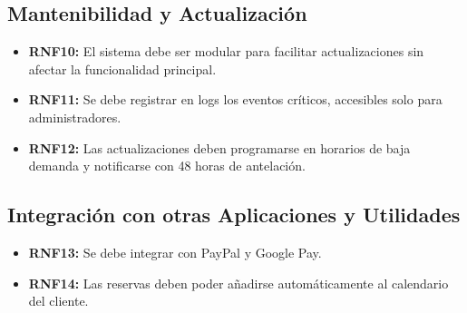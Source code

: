 \documentclass[a4paper, 12pt]{article}
\begin{document}
\subsection{Mantenibilidad y Actualización}
\begin{itemize}
    \item \textbf{RNF10:} El sistema debe ser modular para facilitar actualizaciones sin afectar la funcionalidad principal.
    \item \textbf{RNF11:} Se debe registrar en logs los eventos críticos, accesibles solo para administradores.
    \item \textbf{RNF12:} Las actualizaciones deben programarse en horarios de baja demanda y notificarse con 48 horas de antelación.
\end{itemize}

\subsection{Integración con otras Aplicaciones y Utilidades}
\begin{itemize}
    \item \textbf{RNF13:} Se debe integrar con PayPal y Google Pay.
    \item \textbf{RNF14:} Las reservas deben poder añadirse automáticamente al calendario del cliente.
\end{itemize}
\end{document}
